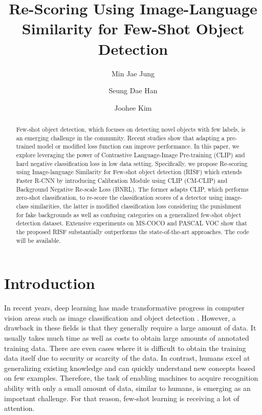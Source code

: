 \documentclass{article}
\title{Re-Scoring Using Image-Language Similarity for Few-Shot Object Detection}
\author[]{Min Jae Jung}
\author[]{Seung Dae Han}
\author[]{Joohee Kim}
\affil[]{AI Lab, INFINIQ}
\affil[]{\{mjjung, jhkim\}@infiniq.co.kr}
\date{}
\begin{document}
\maketitle

\begin{abstract}
Few-shot object detection, which focuses on detecting novel objects with few labels, is an emerging challenge in the community.
Recent studies show that adapting a pre-trained model or modified loss function can improve performance.
In this paper, we explore leveraging the power of Contrastive Language-Image Pre-training (CLIP) and hard negative classification loss in low data setting.
Specifically, we propose Re-scoring using Image-language Similarity for Few-shot object detection (RISF) which extends Faster R-CNN by introducing Calibration Module using CLIP (CM-CLIP) and Background Negative Re-scale Loss (BNRL).
The former adapts CLIP, which performs zero-shot classification, to re-score the classification scores of a detector using image-class similarities,
the latter is modified classification loss considering the punishment for fake backgrounds as well as confusing categories on a generalized few-shot object detection dataset.
Extensive experiments on MS-COCO and PASCAL VOC show that the proposed RISF substantially outperforms the state-of-the-art approaches.
The code will be available.
\end{abstract}


\section{Introduction}
In recent years, deep learning has made transformative progress in computer vision areas such as image classification \cite{resnet, vit} and object detection \cite{faster, fast, cascade, detr, retina, yolo}. 
However, a drawback in these fields is that they generally require a large amount of data.
It usually takes much time as well as costs to obtain large amounts of annotated training data.
There are even cases where it is difficult to obtain the training data itself due to security or scarcity of the data.
In contrast, humans excel at generalizing existing knowledge and can quickly understand new concepts based on few examples. 
Therefore, the task of enabling machines to acquire recognition ability with only a small amount of data, similar to humans, is emerging as an important challenge.
For that reason, few-shot learning is receiving a lot of attention.
\end{document}
